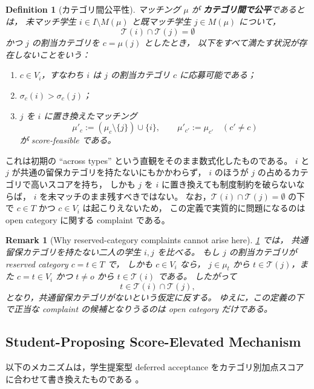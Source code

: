 \documentclass[
  12pt,
  a4paper,
  oneside,
  onecolumn,
  titlepage,
  final
]{jsarticle}
\newtheorem{remark}{Remark}
\newtheorem{definition}{Definition}
\newcommand{\1}{\mathbf{1}}
\begin{document}
\begin{definition}[カテゴリ間公平性]
\label{def:across-no-common-category}
マッチング $\mu$ が
\textbf{カテゴリ間で公平}であるとは，
未マッチ学生 $i\in I\setminus M(\mu)$ と既マッチ学生 $j\in M(\mu)$ について，
\[
    \mathcal T(i)\cap \mathcal T(j)=\emptyset
\]
かつ $j$ の割当カテゴリを $c=\mu(j)$ としたとき，
以下をすべて満たす状況が存在しないことをいう：
\begin{enumerate}
    \item $c\in V_i$，すなわち $i$ は $j$ の割当カテゴリ $c$ に応募可能である；
    \item $\sigma_c(i)>\sigma_c(j)$；
    \item $j$ を $i$ に置き換えたマッチング
    \[
        \mu'_c:=(\mu_c\setminus\{j\})\cup\{i\},
        \qquad
        \mu'_{c'}:=\mu_{c'}\quad(c'\neq c)
    \]
    が score-feasible である。
\end{enumerate}
\end{definition}

\noindent
これは初期の ``across types'' という直観をそのまま数式化したものである。
$i$ と $j$ が共通の留保カテゴリを持たないにもかかわらず，
$i$ のほうが $j$ の占めるカテゴリで高いスコアを持ち，
しかも $j$ を $i$ に置き換えても制度制約を破らないならば，
$i$ を未マッチのまま残すべきではない。
なお，$\mathcal T(i)\cap\mathcal T(j)=\emptyset$ の下で
$c\in T$ かつ $c\in V_i$ は起こりえないため，
この定義で実質的に問題になるのは open category に関する complaint である。

\begin{remark}[Why reserved-category complaints cannot arise here]
\label{rem:no-common-only-open}
\cref{def:across-no-common-category} では，
共通留保カテゴリを持たない二人の学生 $i,j$ を比べる。
もし $j$ の割当カテゴリが reserved category $c=t\in T$ で，
しかも $c\in V_i$ なら，
$j\in\mu_t$ から $t\in\mathcal T(j)$，また $c=t\in V_i$ かつ $t\neq o$ から
$t\in\mathcal T(i)$ である。
したがって
\[
    t\in\mathcal T(i)\cap\mathcal T(j),
\]
となり，共通留保カテゴリがないという仮定に反する。
ゆえに，この定義の下で正当な complaint の候補となりうるのは open category だけである。
\end{remark}

\subsection{Student-Proposing Score-Elevated Mechanism}

以下のメカニズムは，学生提案型 deferred acceptance をカテゴリ別加点スコアに合わせて書き換えたものである \citep{GaSh62a,Roth08a}。
\end{document}

